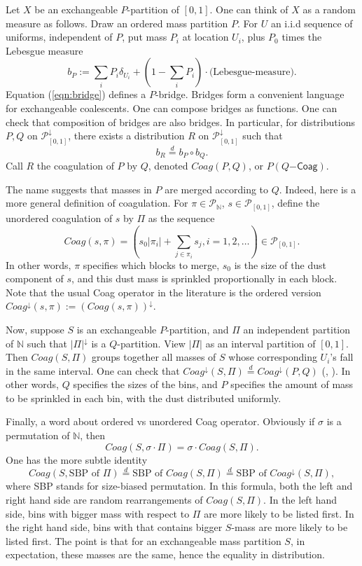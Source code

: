 Let $X$ be an exchangeable $P$-partition of $[0,1]$. One can think of $X$ as a random measure as follows. Draw an ordered mass partition $P$.  For $U$ an i.i.d sequence of uniforms, independent of $P$, put mass $P_i$ at location $U_i$, plus $P_0$ times the Lebesgue measure
\begin{equation}\label{eqn:bridge}
b_P := \sum_iP_i \delta_{U_i} + (1-\sum_iP_i) \cdot \mbox{(Lebesgue-measure)}.
\end{equation}
Equation (\ref{eqn:bridge}) defines a $P$-bridge. Bridges form a convenient language for exchangeable coalescents. One can compose bridges as functions. One can check that composition of bridges are also bridges. In particular, for distributions $P,Q$ on $\mathcal{P}^\downarrow_{[0,1]}$, there exists a distribution $R$ on $\mathcal{P}^\downarrow_{[0,1]}$ such that
$$ b_R \stackrel{d}{=} b_P \circ b_Q. $$
Call $R$ the coagulation of $P$ by $Q$, denoted $Coag(P,Q)$, or $P(Q\mathsf{-Coag})$. 

The name suggests that masses in $P$ are merged according to $Q$. Indeed, here is a more general definition of coagulation. For $\pi \in \mathcal{P}_\mathbb{N}$, $s \in \mathcal{P}_{[0,1]}$, define the unordered coagulation of $s$ by $\Pi$ as the sequence
\begin{equation}\label{eqn:coag.u}
Coag(s,\pi) = (s_0|\pi_i| + \sum_{j \in \pi_i}s_j, i = 1,2,\ldots) \in \mathcal{P}_{[0,1]}.
\end{equation}
In other words, $\pi$ specifies which blocks to merge, $s_0$ is the size of the dust component of $s$, and this dust mass is sprinkled proportionally in each block. Note that the usual Coag operator in the literature is the ordered version $Coag^\downarrow(s,\pi) := (Coag(s,\pi))^\downarrow$. 

Now, suppose $S$ is an exchangeable $P$-partition, and $\Pi$ an independent partition of $\mathbb{N}$ such that $|\Pi|^\downarrow$ is a $Q$-partition. View $|\Pi|$ as an interval partition of $[0,1]$. Then $Coag(S,\Pi)$ groups together all masses of $S$ whose corresponding $U_i$'s fall in the same interval. One can check that $Coag^\downarrow(S,\Pi) \stackrel{d}{=} Coag^\downarrow(P,Q)$ (\cite[Lemma 5.18]{MR2245368}, \cite{MR2253162}). In other words, $Q$ specifies the sizes of the bins, and $P$ specifies the amount of mass to be sprinkled in each bin, with the dust distributed uniformly.

Finally, a word about ordered vs unordered Coag operator. Obviously if $\sigma$ is a permutation of $\mathbb{N}$, then
$$ Coag(S,\sigma\cdot\Pi) = \sigma \cdot Coag(S,\Pi). $$
One has the more subtle identity
$$ Coag(S,\mbox{SBP of } \Pi) \stackrel{d}{=} \mbox{SBP of } Coag(S, \Pi) \stackrel{d}{=} \mbox{SBP of } Coag^\downarrow(S, \Pi), $$
where SBP stands for size-biased permutation. In this formula, both the left and right hand side are random rearrangements of $Coag(S,\Pi)$. In the left hand side, bins with bigger mass with respect to $\Pi$ are more likely to be listed first. In the right hand side, bins with that contains bigger $S$-mass are more likely to be listed first. The point is that for an exchangeable mass partition $S$, in expectation, these masses are the same, hence the equality in distribution. 

